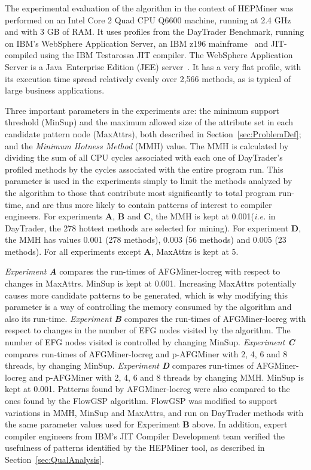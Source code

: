 The experimental evaluation of the algorithm in the context of HEPMiner  was performed on an Intel Core 2 Quad CPU Q6600 machine, running at 2.4 GHz and with 3 GB of RAM. It uses profiles from the DayTrader Benchmark, running on IBM's WebSphere Application Server, an IBM z196 mainframe~\cite{zEnterprise} and JIT-compiled using the IBM Testarossa JIT compiler. The WebSphere Application Server is a Java\textregistered~Enterprise Edition (JEE) server~\cite{WAS}. It has a very flat profile, with its execution time spread relatively evenly over 2,566 methods, as is typical of large business applications. 

Three important parameters in the experiments are: the minimum support threshold (MinSup) and the maximum allowed size of the attribute set in each candidate pattern node (MaxAttrs), both described in Section~\ref{sec:ProblemDef}; and the \emph{Minimum Hotness Method} (MMH) value. The MMH is calculated by dividing the sum of all CPU cycles associated with each one of DayTrader's profiled methods by the cycles associated with the entire program run. This parameter is used in the experiments simply to limit the methods analyzed by the algorithm to those that contribute most significantly to total program run-time, and are thus more likely to contain patterns of interest to compiler engineers. For experiments {\bf A}, {\bf B} and {\bf C}, the MMH is kept at 0.001(\emph{i.e.} in DayTrader, the 278 hottest methods are selected for mining). For experiment {\bf D}, the MMH has values 0.001 (278 methods), 0.003 (56 methods) and 0.005 (23 methods). For all experiments except {\bf A}, MaxAttrs is kept at 5. 

\emph{Experiment {\bf A}} compares the run-times of AFGMiner-locreg with respect to changes in MaxAttrs. MinSup is kept at 0.001. Increasing MaxAttrs potentially causes more candidate patterns to be generated, which is why modifying this parameter is a way of controlling the memory consumed by the algorithm and also its run-time. \emph{Experiment {\bf B}} compares the run-times of AFGMiner-locreg with respect to changes in the number of EFG nodes visited by the algorithm. The number of EFG nodes visited is controlled by changing MinSup. \emph{Experiment {\bf C}} compares run-times of AFGMiner-locreg and p-AFGMiner with 2, 4, 6 and 8 threads, by changing MinSup. \emph{Experiment {\bf D}} compares run-times of AFGMiner-locreg and p-AFGMiner with 2, 4, 6 and 8 threads by changing MMH. MinSup is kept at 0.001. Patterns found by AFGMiner-locreg were also compared to the ones found by the FlowGSP algorithm. FlowGSP was modified to support variations in MMH, MinSup and MaxAttrs, and run on DayTrader methods with the same parameter values used for Experiment {\bf B} above. In addition, expert compiler engineers from IBM's JIT Compiler Development team verified the usefulness of patterns identified by the HEPMiner tool, as described in Section~\ref{sec:QualAnalysis}.







